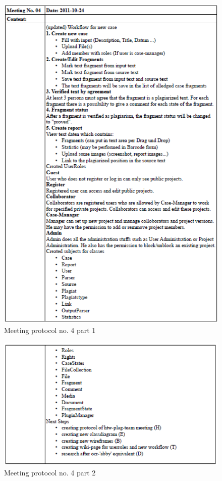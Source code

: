 \begin{appendix}
\begin{figure}
  \centering
    \includegraphics[width=\textwidth]{images/a_meetings/meeting_04a.png}
  \caption{Meeting protocol no. 4 part 1}
  \label{fig:meeting protocol no. 4 part 1}
\end{figure}

\begin{figure}
  \centering
    \includegraphics[width=\textwidth]{images/a_meetings/meeting_04b.png}
  \caption{Meeting protocol no. 4 part 2}
  \label{fig:meeting protocol no. 4 part 2}
\end{figure}


\end{appendix}
